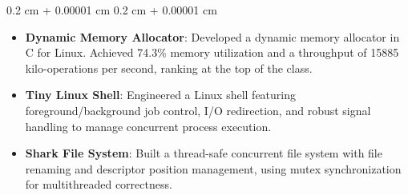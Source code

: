 \documentclass[10pt, letterpaper]{article}
\newenvironment{highlights}{
    \begin{itemize}[
        topsep=0.06 cm,
        parsep=0.06 cm,
        partopsep=0pt,
        itemsep=0pt,
        leftmargin=0.4 cm + 10pt
    ]
}{
    \end{itemize}
} %
\newenvironment{onecolentry}{
    \begin{adjustwidth}{
        0.2 cm + 0.00001 cm
    }{
        0.2 cm + 0.00001 cm
    }
}{
    \end{adjustwidth}
} %
\newenvironment{twocolentry}[2][]{
    \onecolentry
    \def\secondColumn{#2}
    \setcolumnwidth{\fill, 5 cm}
    \begin{paracol}{2}
}{
    \switchcolumn \raggedleft \secondColumn
    \end{paracol}
    \endonecolentry
} %
\begin{document}
        \vspace{0.06 cm}
        \begin{onecolentry}
            \begin{highlights}
                \item \textbf{Dynamic Memory Allocator}: Developed a dynamic memory allocator in C for Linux. Achieved 74.3\% memory utilization and a throughput of 15885 kilo-operations per second, ranking at the top of the class.
                \item \textbf{Tiny Linux Shell}: Engineered a Linux shell featuring foreground/background job control, I/O redirection, and robust signal handling to manage concurrent process execution.
                \item \textbf{Shark File System}: Built a thread-safe concurrent file system with file renaming and descriptor position management, using mutex synchronization for multithreaded correctness.
            \end{highlights}
        \end{onecolentry}

\end{document}
